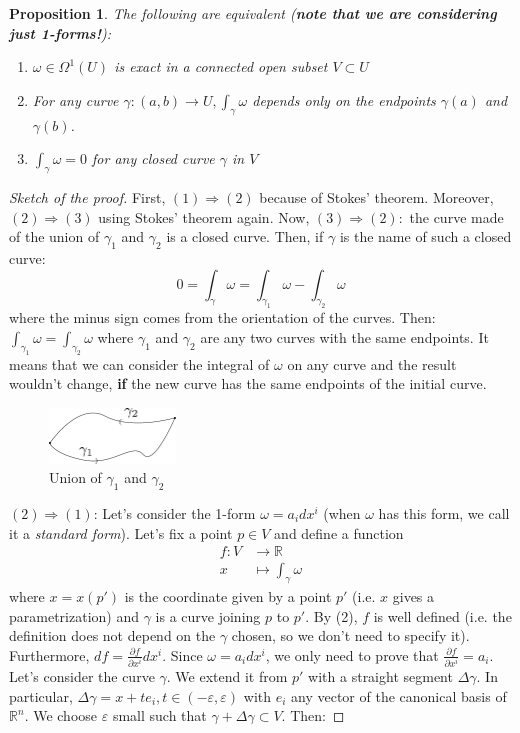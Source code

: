 \documentclass[a4paper,11pt,titlepage, article, oneside]{memoir}
\numberwithin{equation}{section}
\newtheorem{proposition}[theorem]{Proposition}
\theoremstyle{definition}
\theoremstyle{remark}
\newcommand{\rfield}{\mathbb{R}}
\begin{document}
\begin{proposition} \label{propex1forms}
  The following are equivalent (\textbf{note that we are considering just 1-forms!}):
  \begin{enumerate}
    \item $\omega \in \Omega^1(U)$ is exact in a connected open subset $V \subset U$
    \item For any curve $\gamma \colon (a, b) \rightarrow U, \int_{\gamma} \omega$ depends only on the endpoints $\gamma(a)$ and $\gamma(b)$.
    \item $\int_{\gamma} \omega = 0$ for any closed curve $\gamma$ in $V$
  \end{enumerate}
\end{proposition}
\begin{proof}[Sketch of the proof]
First, $(1) \Rightarrow (2)$ because of Stokes' theorem. Moreover, $(2) \Rightarrow (3)$ using Stokes' theorem again. Now, $(3) \Rightarrow (2):$ the curve made of the union of $\gamma_1$ and $\gamma_2$ is a closed curve. Then, if $\gamma$ is the name of such a closed curve:
$$0 = \int_{\gamma} \omega = \int_{\gamma_1} \omega - \int_{\gamma_2} \omega$$
where the minus sign comes from the orientation of the curves. 
Then: $\int_{\gamma_1} \omega = \int_{\gamma_2} \omega$ where $\gamma_1$ and $\gamma_2$ are any two curves with the same endpoints. It means that we can consider the integral of $\omega$ on any curve and the result  wouldn't change, \textbf{if} the new curve has the same endpoints of the initial curve.
\begin{figure}[h] \label{Fig:closedcurve}
     \centering
     \includegraphics[width=0.3\textwidth]{Images/closedcurve.pdf} 
     \caption{Union of $\gamma_1$ and $\gamma_2$}      
\end{figure}
$(2) \Rightarrow (1)$: Let's consider the 1-form $\omega = a_i dx^i$ (when $\omega$ has this form, we call it a \textit{standard form}). Let's fix a point $p \in V$ and define a function 
\begin{align*}
f \colon V &\rightarrow \rfield \\
x &\mapsto \int_{\gamma} \omega
\end{align*}
where $x = x(p')$ is the coordinate given by a point $p'$ (i.e. $x$ gives a parametrization) and $\gamma$ is a curve joining $p$ to $p'$. By (2), $f$ is well defined (i.e. the definition does not depend on the $\gamma$ chosen, so we don't need to specify it). Furthermore, $df = \frac{\partial f}{\partial x^i} dx^i$. Since $\omega = a_i dx^i$, we only need  to prove that $\frac{\partial f}{\partial x^i} = a_i$. Let's consider the curve $\gamma$. We extend it from $p'$ with a straight segment $\Delta \gamma$. In particular, $\Delta \gamma = x + t e_i, t \in (-\varepsilon, \varepsilon)$ with $e_i$ any vector of the canonical basis of $\rfield^n$. We choose $\varepsilon$ small such that $\gamma + \Delta \gamma \subset V$. Then:

\end{proof}
\end{document}
